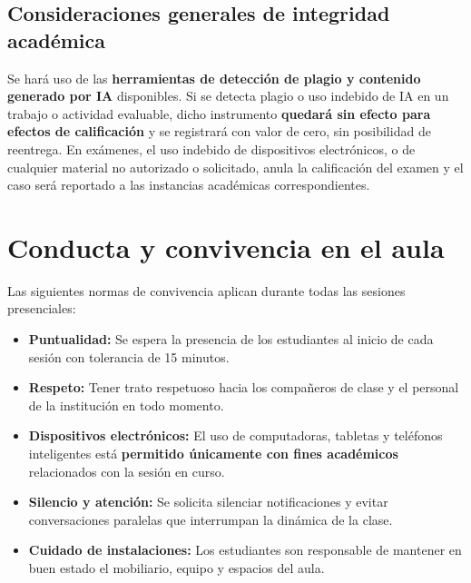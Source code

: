 \documentclass[12pt]{article}
\begin{document}
	\subsection*{Consideraciones generales de integridad académica}
	
	Se hará uso de las \textbf{herramientas de detección de plagio y contenido generado por IA} disponibles. Si se detecta plagio o uso indebido de IA en un trabajo o actividad evaluable, dicho instrumento \textbf{quedará sin efecto para efectos de calificación} y se registrará con valor de cero, sin posibilidad de reentrega. En exámenes, el uso indebido de dispositivos electrónicos, o de cualquier material no autorizado o solicitado, anula la calificación del examen y el caso será reportado a las instancias académicas correspondientes. 
	
	
	\section*{Conducta y convivencia en el aula}
	
	Las siguientes normas de convivencia aplican durante todas las sesiones presenciales:
	
	\begin{itemize}
		\item \textbf{Puntualidad:} Se espera la presencia de los estudiantes al inicio de cada sesión con tolerancia de 15 minutos.
		\item \textbf{Respeto:} Tener trato respetuoso hacia los compañeros de clase y el personal de la institución en todo momento.
		\item \textbf{Dispositivos electrónicos:} El uso de computadoras, tabletas y teléfonos inteligentes está \textbf{permitido únicamente con fines académicos} relacionados con la sesión en curso.
		\item \textbf{Silencio y atención:} Se solicita silenciar notificaciones y evitar conversaciones paralelas que interrumpan la dinámica de la clase.
		\item \textbf{Cuidado de instalaciones:} Los estudiantes son responsable de mantener en buen estado el mobiliario, equipo y espacios del aula.
	\end{itemize}
	
	
	
\end{document}
